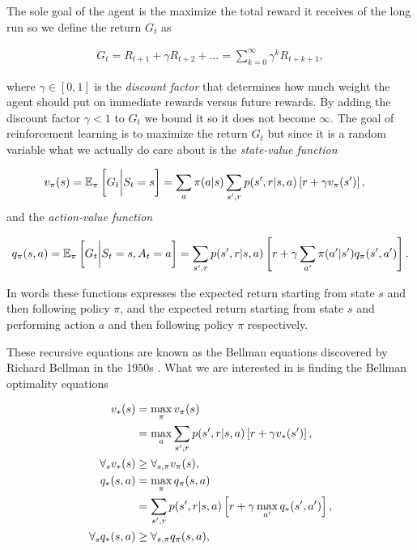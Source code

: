 \documentclass[result.tex]{subfiles}
\begin{document}
    The sole goal of the agent is the maximize the total reward it receives of the long run so we define the return $G_t$ as

    \begin{align*}
        G_t = R_{t + 1} + \gamma R_{t + 2} + \ldots = \sum_{k = 0}^{\infty} \gamma^k R_{t + k + 1},
    \end{align*}

    where $\gamma \in \left[0, 1 \right]$ is the \textit{discount factor} that determines how much weight the agent should put on immediate rewards versus future rewards. By adding the discount factor $\gamma < 1$ to $G_t$ we bound it so it does not become $\infty$. The goal of reinforcement learning is to maximize the return $G_t$ but since it is a random variable what we actually do care about is the \textit{state-value function}

    \begin{align*}
        v_{\pi}(s) &= \mathbb{E}_\pi \left[ G_t \bigg\rvert S_t = s \right]
        = \sum_a \pi(a | s) \sum_{s^\prime, r} p(s^\prime, r | s, a) \left[ r + \gamma v_\pi(s^\prime) \right],
    \end{align*}
    and the \textit{action-value function}

    \begin{align*}
        q_{\pi}(s, a) = \mathbb{E}_\pi \left[ G_t \bigg\rvert S_t = s, A_t = a \right]
        = \sum_{s^\prime, r} p(s^\prime, r | s, a) \left[ r + \gamma \sum_{a^\prime} \pi(a^\prime | s^\prime) q_\pi(s^\prime, a^\prime) \right].
    \end{align*}

    In words these functions expresses the expected return starting from state $s$ and then following policy $\pi$, and the expected return starting from state $s$ and performing action $a$ and then following policy $\pi$ respectively.

    These recursive equations are known as the Bellman equations discovered by Richard Bellman in the 1950s \cite{bellman1952theory}. What we are interested in is finding the Bellman optimality equations

    \begin{align*}
        v_{\ast}(s)
        &= \max_{\pi} v_{\pi}(s) \\
        &= \max_a \sum_{s^\prime, r} p(s^\prime, r | s, a) \left[ r + \gamma v_\ast(s^\prime) \right], \\
        \forall_s v_{\ast}(s) &\geq \forall_{s, \pi} v_{\pi}(s), \\
        q_{\ast}(s, a)
        &= \max_{\pi} q_{\pi}(s, a) \\
        &= \sum_{s^\prime, r} p(s^\prime, r | s, a) \left[ r + \gamma \max_{a^\prime} q_\ast(s^\prime, a^\prime) \right], \\
        \forall_s q_{\ast}(s, a) &\geq \forall_{s, \pi} q_{\pi}(s, a),
    \end{align*}
\end{document}
